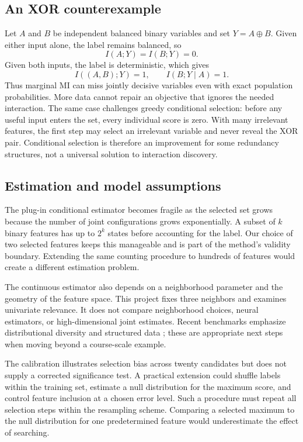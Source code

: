 \documentclass[journal,11pt]{IEEEtran}
\begin{document}
\subsection{An XOR counterexample}
Let $A$ and $B$ be independent balanced binary variables and set $Y=A\oplus B$. Given either input alone, the label remains balanced, so
\begin{equation}
I(A;Y)=I(B;Y)=0.
\end{equation}
Given both inputs, the label is deterministic, which gives
\begin{equation}
I((A,B);Y)=1,\qquad I(B;Y\mid A)=1.
\end{equation}
Thus marginal MI can miss jointly decisive variables even with exact population probabilities. More data cannot repair an objective that ignores the needed interaction. The same case challenges greedy conditional selection: before any useful input enters the set, every individual score is zero. With many irrelevant features, the first step may select an irrelevant variable and never reveal the XOR pair. Conditional selection is therefore an improvement for some redundancy structures, not a universal solution to interaction discovery.

\subsection{Estimation and model assumptions}
The plug-in conditional estimator becomes fragile as the selected set grows because the number of joint configurations grows exponentially. A subset of $k$ binary features has up to $2^k$ states before accounting for the label. Our choice of two selected features keeps this manageable and is part of the method's validity boundary. Extending the same counting procedure to hundreds of features would create a different estimation problem.

The continuous estimator also depends on a neighborhood parameter and the geometry of the feature space. This project fixes three neighbors and examines univariate relevance. It does not compare neighborhood choices, neural estimators, or high-dimensional joint estimates. Recent benchmarks emphasize distributional diversity and structured data \cite{beyond,benchmark}; these are appropriate next steps when moving beyond a course-scale example.

The calibration illustrates selection bias across twenty candidates but does not supply a corrected significance test. A practical extension could shuffle labels within the training set, estimate a null distribution for the maximum score, and control feature inclusion at a chosen error level. Such a procedure must repeat all selection steps within the resampling scheme. Comparing a selected maximum to the null distribution for one predetermined feature would underestimate the effect of searching.
\end{document}
